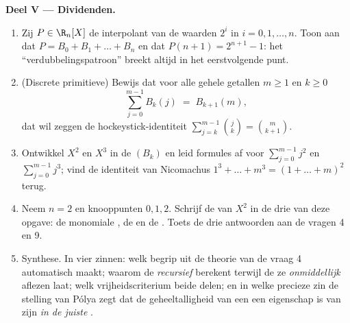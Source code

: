\begin{problem}
\medskip
\noindent\textbf{Deel V --- Dividenden.}
\begin{enumerate}[resume]
  \item Zij $P \in \R_n[X]$ de interpolant van de waarden $2^i$ in
        $i = 0, 1, \dots, n$. Toon aan dat $P = B_0 + B_1 + \dots +
        B_n$ en dat $P(n + 1) = 2^{n+1} - 1$: het
        ``verdubbelingspatroon'' breekt altijd in het
        eerstvolgende punt.
  \item (Discrete primitieve) Bewijs dat voor alle gehele getallen
        $m \geq 1$ en $k \geq 0$
        \[
        \sum_{j=0}^{m-1} B_k(j) \;=\; B_{k+1}(m),
        \]
        dat wil zeggen de hockeystick-identiteit $\sum_{j=k}^{m-1}
        \binom{j}{k} = \binom{m}{k+1}$.
  \item Ontwikkel $X^2$ en $X^3$ in de  $(B_k)$ en leid
         formules af voor $\sum_{j=0}^{m-1} j^2$ en
        $\sum_{j=0}^{m-1} j^3$; vind de identiteit van Nicomachus
        $1^3 + \dots + m^3 = (1 + \dots + m)^2$ terug.
  \item Neem $n = 2$ en knooppunten $0, 1, 2$. Schrijf de
         van $X^2$ in de drie  van deze opgave: de
        monomiale , de  en de .
        Toets de drie antwoorden aan de vragen 4 en 9.
  \item Synthese. In vier zinnen: welk begrip uit de theorie van de
         vraag 4 automatisch maakt; waarom de
          \emph{recursief} berekent terwijl
        de  ze \emph{onmiddellijk} aflezen laat; welk
        vrijheidscriterium beide  delen; en in welke precieze
        zin de stelling van Pólya zegt dat de geheeltalligheid van
        een  een eigenschap is van zijn  \emph{in
        de juiste }.
\end{enumerate}
\end{problem}

